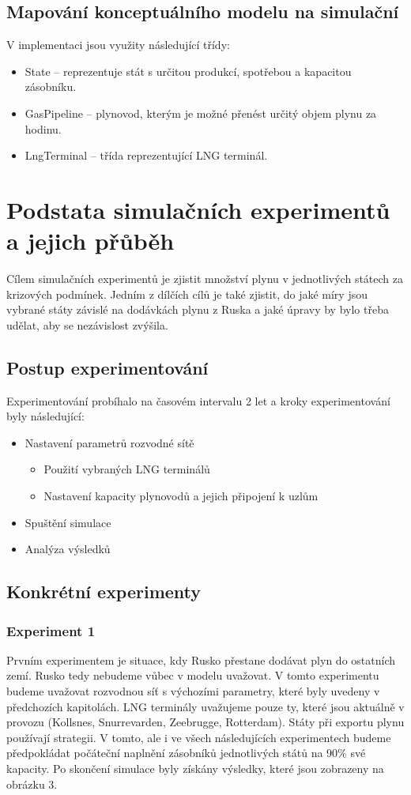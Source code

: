 \documentclass[a4paper,12pt]{article}
\begin{document}
  \subsection{Mapování konceptuálního modelu na simulační}
  V implementaci jsou využity následující třídy:
  \begin{itemize}
    \item State -- reprezentuje stát s určitou produkcí, spotřebou a kapacitou zásobníku.
    \item GasPipeline -- plynovod, kterým je možné přenést určitý objem plynu za hodinu.
    \item LngTerminal -- třída reprezentující LNG terminál.
  \end{itemize}
  
  \section{Podstata simulačních experimentů a jejich přůběh}
  Cílem simulačních experimentů je zjistit množství plynu v jednotlivých státech za krizových podmínek. 
  Jedním z dílčích cílů je také zjistit, do jaké míry jsou vybrané státy závislé na dodávkách plynu z 
  Ruska a jaké úpravy by bylo třeba udělat, aby se nezávislost zvýšila.
  
  \subsection{Postup experimentování}
  Experimentování probíhalo na časovém intervalu 2 let a kroky experimentování byly následující:
  \begin{itemize}
    \item Nastavení parametrů rozvodné sítě
    \begin{itemize}
     \item Použití vybraných LNG terminálů
     \item Nastavení kapacity plynovodů a jejich připojení k uzlům
    \end{itemize}
    \item Spuštění simulace
    \item Analýza výsledků
  \end{itemize}
  
  \subsection{Konkrétní experimenty}
  \subsubsection{Experiment 1}
  Prvním experimentem je situace, kdy Rusko přestane dodávat plyn do ostatních zemí. Rusko tedy 
  nebudeme vůbec v modelu uvažovat. V tomto experimentu budeme uvažovat rozvodnou síť s výchozími 
  parametry, které byly uvedeny v předchozích kapitolách. LNG terminály uvažujeme pouze ty, které 
  jsou aktuálně v provozu (Kollsnes, Snurrevarden, Zeebrugge, Rotterdam). Státy při exportu plynu 
  používají  strategii. V tomto, ale i ve všech následujících experimentech budeme 
  předpokládat počáteční naplnění zásobníků jednotlivých států na 90\% své kapacity. Po skončení simulace 
  byly získány výsledky, které jsou 
  zobrazeny na obrázku 3.
  
\end{document}
